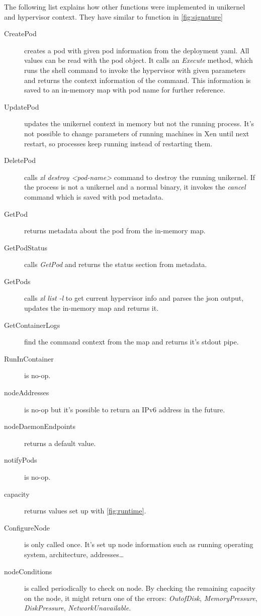 The following list explains how other functions were implemented in unikernel and hypervisor context. They have similar to function in \ref{fig:signature}
\begin{description}  
  \item [CreatePod] creates a pod with given pod information from the deployment yaml. All values can be read with the pod object. It calls an \textit{Execute} method, which runs the shell command to invoke the hypervisor with given parameters and returns the context information of the command. This information is saved to an in-memory map with pod name for further reference.
  \item [UpdatePod] updates the unikernel context in memory but not the running process. It's not possible to change parameters of running machines in Xen until next restart, so processes keep running instead of restarting them.
  \item [DeletePod] calls \textit{xl destroy <pod-name>} command to destroy the running unikernel. If the process is not a unikernel and a normal binary, it invokes the \textit{cancel} command which is saved with pod metadata.
  \item [GetPod] returns metadata about the pod from the in-memory map.
  \item [GetPodStatus] calls \textit{GetPod} and returns the status section from metadata.
  \item [GetPods] calls \textit{xl list -l} to get current hypervisor info and parses the json output, updates the in-memory map and returns it.
  \item [GetContainerLogs] find the command context from the map and returns it's stdout pipe. 
  \item [RunInContainer] is no-op.
  \item [nodeAddresses] is no-op but it's possible to return an IPv6 address in the future.
  \item [nodeDaemonEndpoints] returns a default value.
  \item [notifyPods] is no-op.
  \item [capacity] returns values set up with \ref{fig:runtime}.
  \item [ConfigureNode] is only called once. It's set up node information such as running operating system, architecture, addresses\ldots
  \item [nodeConditions] is called periodically to check on node. By checking the remaining capacity on the node, it might return one of the errors: \textit{OutofDisk}, \textit{MemoryPressure}, \textit{DiskPressure}, \textit{NetworkUnavailable}. 
  \end{description}
